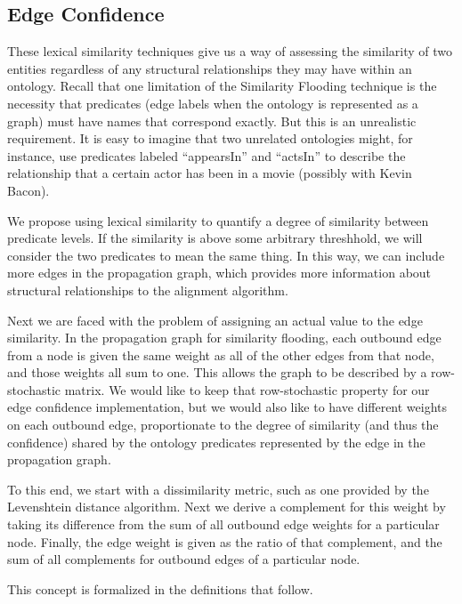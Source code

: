 \documentclass[letterpaper,twocolumn,12pt]{article}
\begin{document}
\subsection{Edge Confidence}
These lexical similarity techniques give us a way of assessing the similarity of two entities regardless of any structural relationships they may have within an ontology. 
Recall that one limitation of the Similarity Flooding technique is the necessity that predicates (edge labels when the ontology is represented as a graph) must have names that correspond exactly. 
But this is an unrealistic requirement. 
It is easy to imagine that two unrelated ontologies might, for instance, use predicates labeled ``appearsIn'' and ``actsIn'' to describe the relationship that a certain actor has been in a movie (possibly with Kevin Bacon).

We propose using lexical similarity to quantify a degree of similarity between predicate levels. 
If the similarity is above some arbitrary threshhold, we will consider the two predicates to mean the same thing.
In this way, we can include more edges in the propagation graph, which provides more information about structural relationships to the alignment algorithm.

Next we are faced with the problem of assigning an actual value to the edge similarity. 
In the propagation graph for similarity flooding, each outbound edge from a node is given the same weight as all of the other edges from that node, and those weights all sum to one. 
This allows the graph to be described by a row-stochastic matrix. 
We would like to keep that row-stochastic property for our edge confidence implementation, but we would also like to have different weights on each outbound edge,
proportionate to the degree of similarity (and thus the confidence) shared by the ontology predicates represented by the edge in the propagation graph.

To this end, we start with a dissimilarity metric, such as one provided by the Levenshtein distance algorithm. 
Next we derive a complement for this weight by taking its difference from the sum of all outbound edge weights for a particular node. 
Finally, the edge weight is given as the ratio of that complement, and the sum of all complements for outbound edges of a particular node.

This concept is formalized in the definitions that follow.
\end{document}
